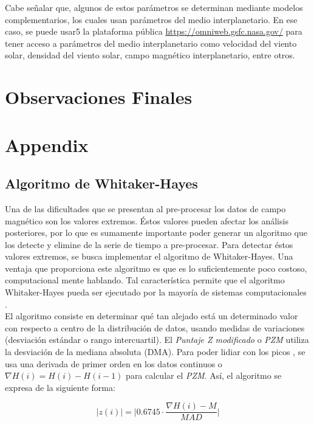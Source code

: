 \documentclass[preprint,12pt]{article}
\begin{document}
Cabe señalar que, algunos de estos parámetros se determinan mediante modelos complementarios, los cuales usan parámetros del medio interplanetario. En ese caso, se puede usar5 la plataforma pública \url{https://omniweb.gsfc.nasa.gov/} para tener acceso a parámetros del medio interplanetario como velocidad del viento solar, densidad del viento solar, campo magnético interplanetario, entre otros.\\

\section{Observaciones Finales}
\label{S:3}






\section{Appendix}
\label{S.4}


\subsection{Algoritmo de Whitaker-Hayes}
Una de las dificultades que se presentan al pre-procesar los datos de campo magnético son los valores extremos. Éstos valores pueden afectar los análisis posteriores, por lo que es sumamente importante poder generar un algoritmo que los detecte y elimine de la serie de tiempo a pre-procesar. Para detectar éstos valores extremos, se busca implementar el algoritmo de Whitaker-Hayes. Una ventaja que proporciona este algoritmo es que es lo suficientemente poco costoso, computacional mente hablando. Tal característica permite que el algoritmo Whitaker-Hayes pueda ser ejecutado por la mayoría de sistemas computacionales \cite{WHITAKER2018}.\\

El algoritmo consiste en determinar qué tan alejado está un determinado valor con respecto a centro de la distribución de datos, usando medidas de variaciones (desviación estándar o rango intercuartil). El \emph{Puntaje Z modificado} o \emph{PZM}  utiliza la desviación de la mediana absoluta (DMA). Para poder lidiar con los picos \citep{WHITAKER2018, removing_with_Whitaker-Hayes}, se usa una derivada de primer orden en los datos continuos o $\nabla H(i) = H(i)- H(i-1)$ para calcular el \emph{PZM}. Así, el algoritmo se expresa de la siguiente forma:

\begin{equation}
	\lvert z(i)\rvert = \bigg| 0.6745 \cdot \frac{\nabla H(i) - M}{MAD}\bigg|
\end{equation}
\end{document}
